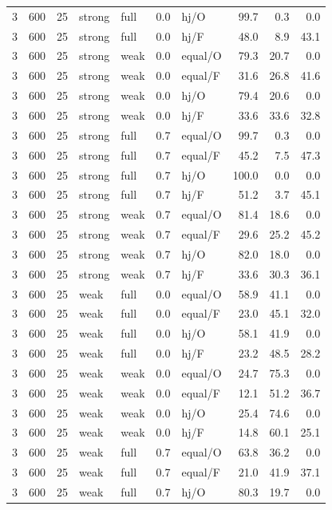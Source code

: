 {\begin{longtable}{@{}rrrllllrrr@{}}
3 & 600 & 25 & strong & full & 0.0 & hj/O & 99.7 & 0.3 & 0.0\\
3 & 600 & 25 & strong & full & 0.0 & hj/F & 48.0 & 8.9 & 43.1\\
3 & 600 & 25 & strong & weak & 0.0 & equal/O & 79.3 & 20.7 & 0.0\\
3 & 600 & 25 & strong & weak & 0.0 & equal/F & 31.6 & 26.8 & 41.6\\
3 & 600 & 25 & strong & weak & 0.0 & hj/O & 79.4 & 20.6 & 0.0\\
3 & 600 & 25 & strong & weak & 0.0 & hj/F & 33.6 & 33.6 & 32.8\\
3 & 600 & 25 & strong & full & 0.7 & equal/O & 99.7 & 0.3 & 0.0\\
3 & 600 & 25 & strong & full & 0.7 & equal/F & 45.2 & 7.5 & 47.3\\
3 & 600 & 25 & strong & full & 0.7 & hj/O & 100.0 & 0.0 & 0.0\\
3 & 600 & 25 & strong & full & 0.7 & hj/F & 51.2 & 3.7 & 45.1\\
3 & 600 & 25 & strong & weak & 0.7 & equal/O & 81.4 & 18.6 & 0.0\\
3 & 600 & 25 & strong & weak & 0.7 & equal/F & 29.6 & 25.2 & 45.2\\
3 & 600 & 25 & strong & weak & 0.7 & hj/O & 82.0 & 18.0 & 0.0\\
3 & 600 & 25 & strong & weak & 0.7 & hj/F & 33.6 & 30.3 & 36.1\\
3 & 600 & 25 & weak & full & 0.0 & equal/O & 58.9 & 41.1 & 0.0\\
3 & 600 & 25 & weak & full & 0.0 & equal/F & 23.0 & 45.1 & 32.0\\
3 & 600 & 25 & weak & full & 0.0 & hj/O & 58.1 & 41.9 & 0.0\\
3 & 600 & 25 & weak & full & 0.0 & hj/F & 23.2 & 48.5 & 28.2\\
3 & 600 & 25 & weak & weak & 0.0 & equal/O & 24.7 & 75.3 & 0.0\\
3 & 600 & 25 & weak & weak & 0.0 & equal/F & 12.1 & 51.2 & 36.7\\
3 & 600 & 25 & weak & weak & 0.0 & hj/O & 25.4 & 74.6 & 0.0\\
3 & 600 & 25 & weak & weak & 0.0 & hj/F & 14.8 & 60.1 & 25.1\\
3 & 600 & 25 & weak & full & 0.7 & equal/O & 63.8 & 36.2 & 0.0\\
3 & 600 & 25 & weak & full & 0.7 & equal/F & 21.0 & 41.9 & 37.1\\
3 & 600 & 25 & weak & full & 0.7 & hj/O & 80.3 & 19.7 & 0.0\\

\end{longtable}}
